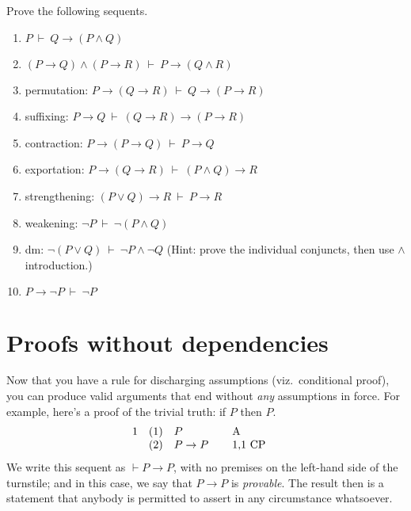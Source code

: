   \newcommand{\sitem}{\stepcounter{enumi}\item[\!\!$^\ast$\theenumi.]}

\begin{exercises} Prove the following sequents.
  \begin{enumerate}
  \item $P\:\vdash\: Q\to (P\wedge Q)$
  \item $(P\to Q)\wedge (P\to R)\:\vdash\: P\to (Q\wedge R)$
\item permutation: $P\to (Q\to R)\:\vdash\: Q\to (P\to R)$
\item suffixing: $P\to Q\:\vdash\: (Q\to R)\to (P\to R)$
\item contraction: $P\to (P\to Q)\:\vdash\: P\to Q$  
\item exportation: $P\to (Q\to R)\:\vdash\: (P\wedge Q)\to R$
\item strengthening: $(P\vee Q)\to R\:\vdash\: P\to R$
\item weakening: $\neg P\:\vdash\: \neg (P\wedge Q)$  
\item \gls{dm}: $\neg (P\vee Q)\:\vdash\: \neg P\wedge\neg
  Q$ \newline (Hint: prove the individual conjuncts, then use $\wedge$
  introduction.)
\sitem $P\to \neg P\:\vdash\:\neg P$  
  \end{enumerate}
\end{exercises}


\section{Proofs without dependencies}

Now that you have a rule for discharging assumptions (viz.\
conditional proof), you can produce valid arguments that end without
{\it any} assumptions in force.  For example, here's a proof of the
trivial truth: if $P$ then $P$.
\[ \begin{array}{l l >{$}p{1.5cm}<{$} p{1.5cm}}
  1 & (1) & P & A \\
    & (2) & P\to P & 1,1 CP
   \end{array} \]
We write this sequent as $\vdash P\to P$, with no premises on the
left-hand side of the turnstile; and in this case, we say that $P\to P$
is \emph{provable}.  The result then is a statement that
anybody is permitted to assert in any circumstance whatsoever.  

